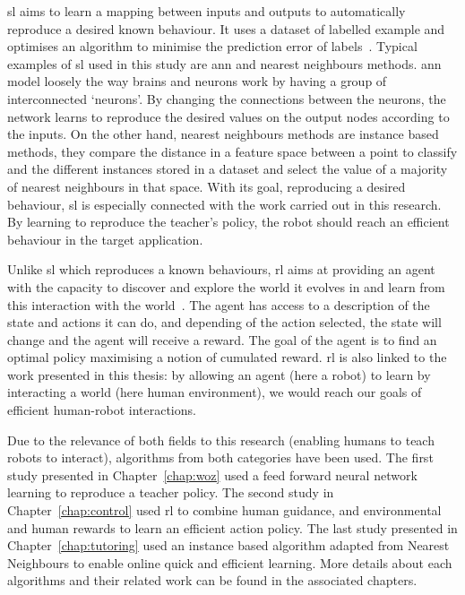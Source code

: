 \gls{sl} aims to learn a mapping between inputs and outputs to automatically reproduce a desired known behaviour. It uses a dataset of labelled example and optimises an algorithm to minimise the prediction error of labels~\citep{russell2016artificial}. Typical examples of \gls{sl} used in this study are \gls{ann} and nearest neighbours methods. \gls{ann} model loosely the way brains and neurons work by having a group of interconnected `neurons'. By changing the connections between the neurons, the network learns to reproduce the desired values on the output nodes according to the inputs. On the other hand, nearest neighbours methods are instance based methods, they compare the distance in a feature space between a point to classify and the different instances stored in a dataset and select the value of a majority of nearest neighbours in that space. With its goal, reproducing a desired behaviour, \gls{sl} is especially connected with the work carried out in this research. By learning to reproduce the teacher's policy, the robot should reach an efficient behaviour in the target application.

Unlike \gls{sl} which reproduces a known behaviours, \gls{rl} aims at providing an agent with the capacity to discover and explore the world it evolves in and learn from this interaction with the world~\citep{sutton1998reinforcement}. The agent has access to a description of the state and actions it can do, and depending of the action selected, the state will change and the agent will receive a reward. The goal of the agent is to find an optimal policy maximising a notion of cumulated reward. \gls{rl} is also linked to the work presented in this thesis: by allowing an agent (here a robot) to learn by interacting a world (here human environment), we would reach our goals of efficient human-robot interactions.

Due to the relevance of both fields to this research (enabling humans to teach robots to interact), algorithms from both categories have been used. The first study presented in Chapter~\ref{chap:woz} used a feed forward neural network learning to reproduce a teacher policy. The second study in Chapter~\ref{chap:control} used \gls{rl} to combine human guidance, and environmental and human rewards to learn an efficient action policy. The last study presented in Chapter~\ref{chap:tutoring} used an instance based algorithm adapted from Nearest Neighbours to enable online quick and efficient learning. More details about each algorithms and their related work can be found in the associated chapters.

